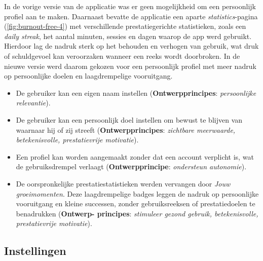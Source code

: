 In de vorige versie van de applicatie was er geen mogelijkheid om een persoonlijk profiel aan te maken. Daarnaast bevatte de applicatie een aparte \textit{statistics}-pagina (\ref{fig:burnout-free-4}) met verschillende prestatiegerichte statistieken, zoals een \textit{daily streak}, het aantal minuten, sessies en dagen waarop de app werd gebruikt. Hierdoor lag de nadruk sterk op het behouden en verhogen van gebruik, wat druk of schuldgevoel kan veroorzaken wanneer een reeks wordt doorbroken. In de nieuwe versie werd daarom gekozen voor een persoonlijk profiel met meer nadruk op persoonlijke doelen en laagdrempelige vooruitgang.

{\small
    \begin{itemize}
        \item De gebruiker kan een eigen naam instellen (\textbf{Ontwerpprincipes}: \textit{persoonlijke relevantie}).
        
        \item De gebruiker kan een persoonlijk doel instellen om bewust te blijven van waarnaar hij of zij streeft (\textbf{Ontwerpprincipes}: \textit{zichtbare meerwaarde, betekenisvolle, prestatievrije motivatie}).
        
        \item Een profiel kan worden aangemaakt zonder dat een account verplicht is, wat de gebruiksdrempel verlaagt (\textbf{Ontwerpprincipe}: \textit{ondersteun autonomie}).
        
        \item De oorspronkelijke prestatiestatistieken werden vervangen door \textit{Jouw groeimomenten}. Deze laagdrempelige badges leggen de nadruk op persoonlijke vooruitgang en kleine successen, zonder gebruiksreeksen of prestatiedoelen te benadrukken (\textbf{Ontwerp- principes}: \textit{stimuleer gezond gebruik, betekenisvolle, prestatievrije motivatie}).
    \end{itemize}
}


\subsection{Instellingen}
\label{subsec:settings-mockups}

